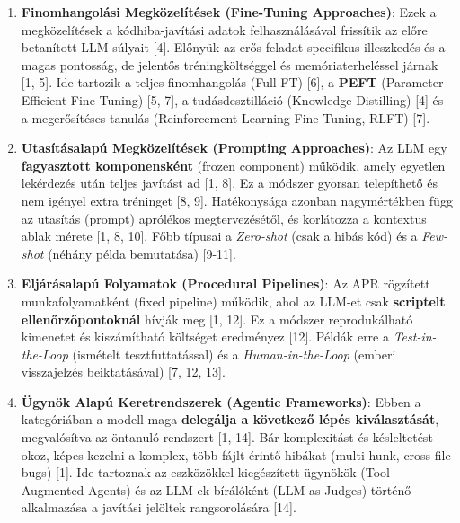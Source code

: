 \begin{enumerate}
    \item \textbf{Finomhangolási Megközelítések (Fine-Tuning Approaches)}:
    Ezek a megközelítések a kódhiba-javítási adatok felhasználásával frissítik az előre betanított LLM súlyait [4]. Előnyük az erős feladat-specifikus illeszkedés és a magas pontosság, de jelentős tréningköltséggel és memóriaterheléssel járnak [1, 5]. Ide tartozik a teljes finomhangolás (Full FT) [6], a \textbf{PEFT} (Parameter-Efficient Fine-Tuning) [5, 7], a tudásdesztilláció (Knowledge Distilling) [4] és a megerősítéses tanulás (Reinforcement Learning Fine-Tuning, RLFT) [7].
    
    \item \textbf{Utasításalapú Megközelítések (Prompting Approaches)}:
    Az LLM egy \textbf{fagyasztott komponensként} (frozen component) működik, amely egyetlen lekérdezés után teljes javítást ad [1, 8]. Ez a módszer gyorsan telepíthető és nem igényel extra tréninget [8, 9]. Hatékonysága azonban nagymértékben függ az utasítás (prompt) aprólékos megtervezésétől, és korlátozza a kontextus ablak mérete [1, 8, 10]. Főbb típusai a \emph{Zero-shot} (csak a hibás kód) és a \emph{Few-shot} (néhány példa bemutatása) [9-11].

    \item \textbf{Eljárásalapú Folyamatok (Procedural Pipelines)}:
    Az APR rögzített munkafolyamatként (fixed pipeline) működik, ahol az LLM-et csak \textbf{scriptelt ellenőrzőpontoknál} hívják meg [1, 12]. Ez a módszer reprodukálható kimenetet és kiszámítható költséget eredményez [12]. Példák erre a \emph{Test-in-the-Loop} (ismételt tesztfuttatással) és a \emph{Human-in-the-Loop} (emberi visszajelzés beiktatásával) [7, 12, 13].

    \item \textbf{Ügynök Alapú Keretrendszerek (Agentic Frameworks)}:
    Ebben a kategóriában a modell maga \textbf{delegálja a következő lépés kiválasztását}, megvalósítva az öntanuló rendszert [1, 14]. Bár komplexitást és késleltetést okoz, képes kezelni a komplex, több fájlt érintő hibákat (multi-hunk, cross-file bugs) [1]. Ide tartoznak az eszközökkel kiegészített ügynökök (Tool-Augmented Agents) és az LLM-ek bírálóként (LLM-as-Judges) történő alkalmazása a javítási jelöltek rangsorolására [14].
\end{enumerate}


